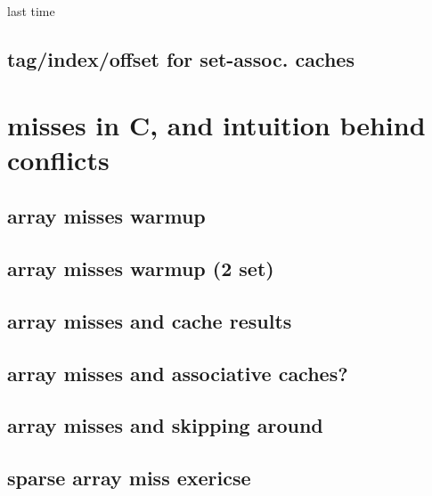 \date{}
\title{}
\date{}

\begin{frame}
    \titlepage
\end{frame}

\begin{frame}{last time}
\end{frame}

\subsection{tag/index/offset for set-assoc. caches}




\section{misses in C, and intuition behind conflicts}


\subsection{array misses warmup}


\subsection{array misses warmup (2 set)}



\subsection{array misses and cache results}


\subsection{array misses and associative caches?}


\subsection{array misses and skipping around}


\subsection{sparse array miss exericse}


